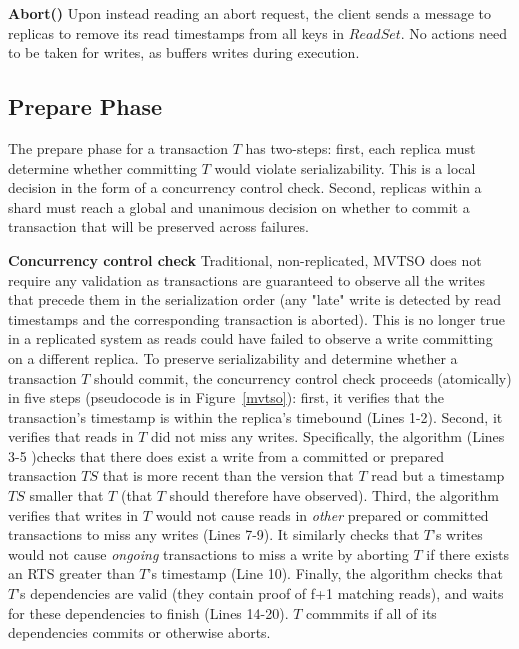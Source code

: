 \par \textbf{Abort()} Upon instead reading an abort request,
the client sends a message to replicas to remove its read timestamps from all keys in $ReadSet$. No actions need to be taken for writes, as \sys buffers writes during execution.

\subsection{Prepare Phase}
The prepare phase for a transaction $T$ has two-steps: first,
each replica must determine whether committing $T$ would violate serializability. This is a local decision in the form of a concurrency control check. Second, replicas within a shard must reach a global and unanimous decision on whether to commit a transaction that will be preserved across failures.

\par \textbf{Concurrency control check} Traditional, non-replicated, MVTSO does not require any validation as transactions are guaranteed to observe all the writes that precede them in the serialization order (any "late" write is detected by read timestamps and the corresponding transaction is aborted). This is no longer true in a replicated system as reads could have failed to observe a write committing on a different replica. To preserve serializability
and determine whether a transaction $T$ should commit, the concurrency control check proceeds (atomically) in five steps (pseudocode is in Figure~\ref{mvtso}): first, it verifies that the transaction's timestamp is within the replica's timebound (Lines 1-2). Second, it verifies that reads in $T$ did not miss any writes. Specifically, the algorithm (Lines 3-5 )checks that there does exist a write 
from a committed or prepared transaction $TS$ that is more recent than the version that $T$ read but a timestamp $TS$ smaller that $T$ (that $T$ should therefore have observed).
Third, the algorithm verifies that writes in $T$ would not cause reads in \textit{other} prepared
or committed transactions to miss any writes (Lines 7-9). It similarly checks that $T$'s writes would not cause \textit{ongoing} transactions to miss a write by aborting $T$ if there exists an RTS greater than $T$'s timestamp (Line 10). Finally, the algorithm checks that $T$'s dependencies are valid (they contain proof of f+1 matching reads), and waits for these dependencies to finish (Lines 14-20). $T$ commmits if all of its dependencies commits  or otherwise aborts.

